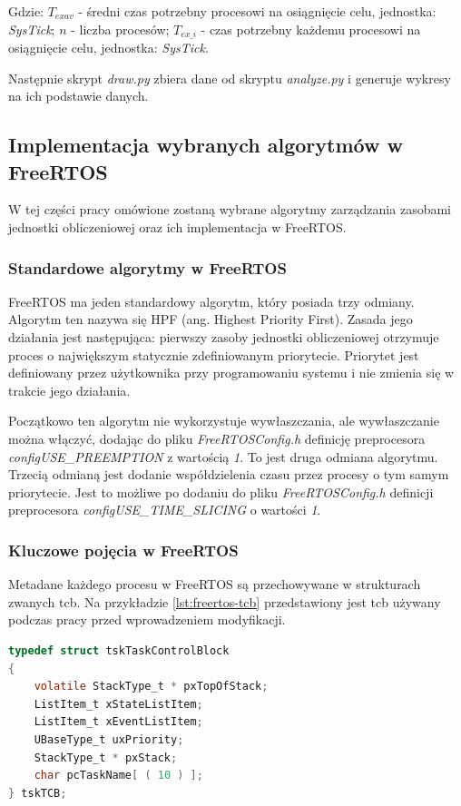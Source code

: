 \documentclass[../../main]{subfiles}
\begin{document}
Gdzie: $T_{exav}$ - średni czas potrzebny procesowi na osiągnięcie celu, jednostka: \textit{SysTick}; $n$ - liczba procesów;  $T_{ex\_i}$ - czas potrzebny każdemu procesowi na osiągnięcie celu, jednostka: \textit{SysTick}.

Następnie skrypt \textit{draw.py} zbiera dane od skryptu \textit{analyze.py} i generuje wykresy na ich podstawie danych.

\subsection{Implementacja wybranych algorytmów w FreeRTOS}

W tej części pracy omówione zostaną wybrane algorytmy zarządzania zasobami jednostki obliczeniowej oraz ich implementacja w FreeRTOS.

\subsubsection{Standardowe algorytmy w FreeRTOS}

FreeRTOS ma jeden standardowy algorytm, który posiada trzy odmiany. Algorytm ten nazywa się HPF (ang. Highest Priority First). Zasada jego działania jest następująca: pierwszy zasoby jednostki obliczeniowej otrzymuje proces o największym statycznie zdefiniowanym priorytecie. Priorytet jest definiowany przez użytkownika przy programowaniu systemu i nie zmienia się w trakcie jego działania.

Początkowo ten algorytm nie wykorzystuje wywłaszczania, ale wywłaszczanie można włączyć, dodając do pliku \textit{FreeRTOSConfig.h} definicję preprocesora \textit{configUSE\_PREEMPTION} z wartością \textit{1}. To jest druga odmiana algorytmu. Trzecią odmianą jest dodanie współdzielenia czasu przez procesy o tym samym priorytecie. Jest to możliwe po dodaniu do pliku \textit{FreeRTOSConfig.h} definicji preprocesora \textit{configUSE\_TIME\_SLICING} o wartości \textit{1}.

\subsubsection{Kluczowe pojęcia w FreeRTOS}

Metadane każdego procesu w FreeRTOS są przechowywane w strukturach zwanych \acrshort{tcb}. Na przykładzie \ref{lst:freertos-tcb} przedstawiony jest \acrshort{tcb} używany podczas pracy przed wprowadzeniem modyfikacji.

\begin{lstlisting}[language=C, label={lst:freertos-tcb}, caption={Przykładowy TCB przed zmianami}]
typedef struct tskTaskControlBlock
{
    volatile StackType_t * pxTopOfStack;
    ListItem_t xStateListItem;
    ListItem_t xEventListItem;
    UBaseType_t uxPriority;
    StackType_t * pxStack;
    char pcTaskName[ ( 10 ) ];
} tskTCB;
\end{lstlisting}
\end{document}
